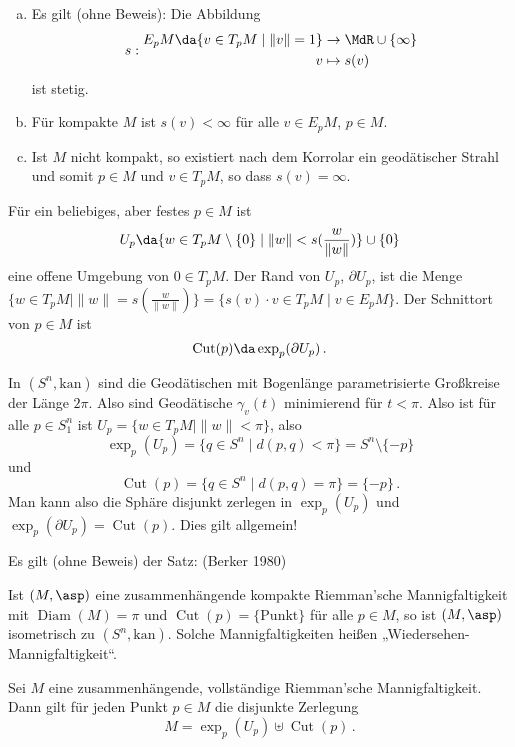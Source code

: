 \documentclass[a4paper,twoside,DIV15,BCOR12mm]{scrbook}
\newcommand{\kan}{\text{kan}}
\DeclareMathOperator{\cut}{Cut}
\begin{document}
\begin{bemerkung}
\begin{enumerate}[(a)]
\item Es gilt (ohne Beweis): Die Abbildung 
\[
s:
\begin{aligned}
E_pM \da \{v \in T_pM \mid \|v\|=1\} &\to \MdR\cup\{\infty\} \\
v &\mapsto s(v)
\end{aligned}
\] ist stetig.
\item Für kompakte $M$ ist $s(v) < \infty$ für alle $v\in E_pM$, $p\in M$.
\item Ist $M$ nicht kompakt, so existiert nach dem Korrolar ein geodätischer Strahl und somit $p\in M$ und $v\in T_pM$, so dass $s(v)=\infty$.
\end{enumerate}
\end{bemerkung}

Für ein beliebiges, aber festes $p\in M$ ist
\[
U_p \da \{ w\in T_pM\setminus \{0\} \mid \|w\| < s(\frac w {\|w\|})\} \cup \{0\}
\] eine offene Umgebung von $0\in T_pM$. Der Rand von $U_p$, $\partial U_p$, ist die Menge $\{w\in T_pM | \|w\| = s(\frac w{\|w\|})\} = \{s(v) \cdot v \in T_pM \mid v \in E_pM\}$. Der Schnittort von $p\in M$ ist \[ \cut(p) \da \exp_p(\partial U_p)\,.\]

\begin{beispiel}
In $(S^n,\kan)$ sind die Geodätischen mit Bogenlänge parametrisierte Großkreise der Länge $2\pi$. Also sind Geodätische $\gamma_v(t)$ minimierend für $t<\pi$. Also ist für alle $p\in S^n_1$ ist $U_p=\{w\in T_pM \mid \|w\| <\pi\}$, also \[\exp_p(U_p) = \{q\in S^n \mid d(p,q)<\pi \} = S^n\setminus \{-p\}\] und \[\cut(p) = \{q\in S^n \mid d(p,q)=\pi \} = \{-p\}\,.\] Man kann also die Sphäre disjunkt zerlegen in $\exp_p(U_p)$ und $\exp_p(\partial U_p) = \cut(p)$. Dies gilt allgemein!
\end{beispiel}

\begin{bemerkung}
Es gilt (ohne Beweis) der Satz: (Berker 1980)

Ist $(M,\asp)$ eine zusammenhängende kompakte Riemman’sche Mannigfaltigkeit mit $\operatorname{Diam}(M)=\pi$ und $\cut(p) = \{\text{Punkt}\}$ für alle $p\in M$, so ist $(M,\asp)$ isometrisch zu $(S^n,\kan)$. Solche Mannigfaltigkeiten heißen „Wiedersehen-Mannigfaltigkeit“.
\end{bemerkung}

\begin{satz}[Zerlegungssatz]
\label{zerlsatz}
Sei $M$ eine zusammenhängende, vollständige Riemman’sche Mannigfaltigkeit. Dann gilt für jeden Punkt $p\in M$ die disjunkte Zerlegung
\[
M = \exp_p(U_p) \uplus \cut(p)\,.
\]
\end{satz}
\end{document}
